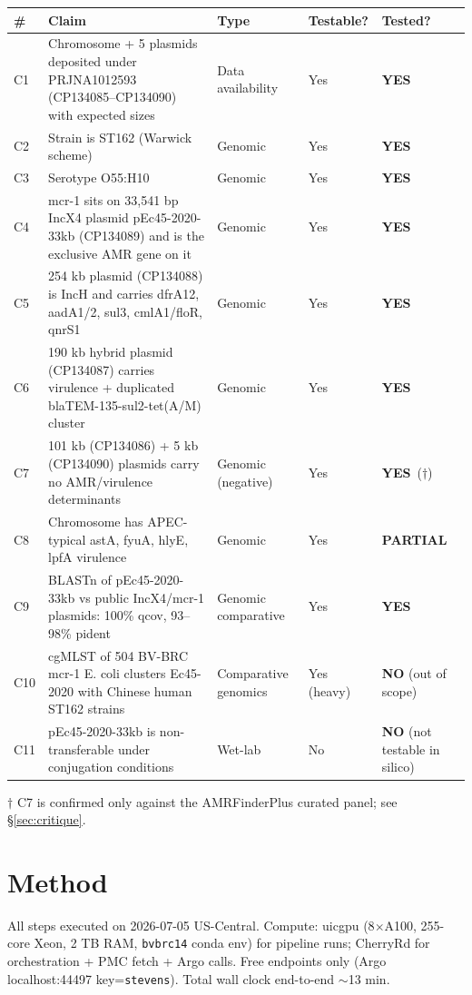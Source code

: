 \documentclass[11pt]{article}
\begin{document}
\begin{longtable}{@{}p{0.6cm}p{9cm}p{2.4cm}p{1.6cm}p{1.6cm}@{}}
\toprule
\# & Claim & Type & Testable? & Tested? \\
\midrule
\endhead
C1 & Chromosome + 5 plasmids deposited under PRJNA1012593 (CP134085--CP134090) with expected sizes & Data availability & Yes & \textbf{YES} \\
C2 & Strain is ST162 (Warwick scheme) & Genomic & Yes & \textbf{YES} \\
C3 & Serotype O55:H10 & Genomic & Yes & \textbf{YES} \\
C4 & mcr-1 sits on 33{,}541 bp IncX4 plasmid pEc45-2020-33kb (CP134089) and is the exclusive AMR gene on it & Genomic & Yes & \textbf{YES} \\
C5 & 254 kb plasmid (CP134088) is IncH and carries dfrA12, aadA1/2, sul3, cmlA1/floR, qnrS1 & Genomic & Yes & \textbf{YES} \\
C6 & 190 kb hybrid plasmid (CP134087) carries virulence + duplicated blaTEM-135-sul2-tet(A/M) cluster & Genomic & Yes & \textbf{YES} \\
C7 & 101 kb (CP134086) + 5 kb (CP134090) plasmids carry no AMR/virulence determinants & Genomic (negative) & Yes & \textbf{YES}\ ($\dagger$) \\
C8 & Chromosome has APEC-typical astA, fyuA, hlyE, lpfA virulence & Genomic & Yes & \textbf{PARTIAL} \\
C9 & BLASTn of pEc45-2020-33kb vs public IncX4/mcr-1 plasmids: 100\% qcov, 93--98\% pident & Genomic comparative & Yes & \textbf{YES} \\
C10 & cgMLST of 504 BV-BRC mcr-1 E. coli clusters Ec45-2020 with Chinese human ST162 strains & Comparative genomics & Yes (heavy) & \textbf{NO} (out of scope) \\
C11 & pEc45-2020-33kb is non-transferable under conjugation conditions & Wet-lab & No & \textbf{NO} (not testable in silico) \\
\bottomrule
\end{longtable}

$\dagger$ C7 is confirmed only against the AMRFinderPlus curated panel; see \S\ref{sec:critique}.

\section{Method}
\label{sec:method}

All steps executed on 2026-07-05 US-Central. Compute: uicgpu (8$\times$A100, 255-core Xeon, 2 TB RAM,
\texttt{bvbrc14} conda env) for pipeline runs; CherryRd for orchestration + PMC fetch + Argo calls.
Free endpoints only (Argo localhost:44497 key=\texttt{stevens}). Total wall clock end-to-end $\sim$13 min.
\end{document}
